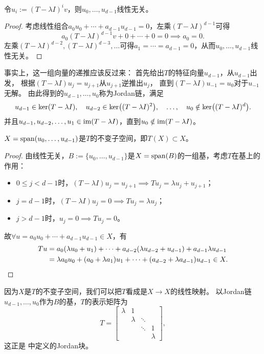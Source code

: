 \begin{theorem}{}{}
	令$u_i:=(T-\lambda I)^iv$，则$u_0,\ldots,u_{d-1}$线性无关。
\end{theorem}

\begin{proof}
	考虑线性组合$a_0u_0+\cdots+a_{d-1}u_{d-1}=0$，左乘$(T-\lambda I)^{d-1}$可得
	\[
		a_0(T-\lambda I)^{d-1}v+0+\cdots+0=0\implies a_0=0.
	\]
	左乘$(T-\lambda I)^{d-2},(T-\lambda I)^{d-3},\ldots$可得$a_1=\cdots=a_{d-1}=0$，从而$u_0,\ldots,u_{d-1}$线性无关。
\end{proof}

\begin{remark}
	事实上，这一组向量的递推应该反过来：
	首先给出$T$的特征向量$u_{d-1}$，从$u_{d-1}$出发，
	根据$(T-\lambda I)u_j=u_{j+1}$从$u_{j+1}$逆推出$u_j$，
	直到$(T-\lambda I)u_{-1}=u_0$对于$u_{-1}$无解。
	由此得到的$u_{d-1},\ldots,u_0$称为Jordan链，满足
	\[
		u_{d-1}\in\ker(T-\lambda I),\quad
		u_{d-2}\in\ker\bigl((T-\lambda I)^2\bigr),\quad
		\ldots,\quad
		u_0\notin\ker\bigl((T-\lambda I)^d\bigr).
	\]
	并且$u_{d-1},u_{d-2},\ldots,u_1\in\operatorname{im}(T-\lambda I)$，直到$u_0\notin\operatorname{im}(T-\lambda I)$。
\end{remark}

\begin{theorem}{}{}
	$X=\operatorname{span}(u_0,\ldots,u_{d-1})$是$T$的不变子空间，即$T(X)\subset X$。
\end{theorem}

\begin{proof}
	由线性无关，$B:=\{u_0,\ldots,u_{d-1}\}$是$X=\operatorname{span}(B)$的一组基，考虑$T$在基上的作用：
	\begin{itemize}
		\item $0\leq j< d-1$时，$(T-\lambda I)u_j=u_{j+1}\implies Tu_j=\lambda u_j+u_{j+1}$；
		\item $j=d-1$时，$(T-\lambda I)u_j=0\implies Tu_j=\lambda u_j$；
		\item $j>d-1$时，$u_j=0\implies Tu_j=0$。
	\end{itemize}
	故$\forall u=a_0u_0+\cdots+a_{d-1}u_{d-1}\in X$，有
	\begin{align*}
		Tu&=a_0(\lambda u_0+u_1)+\cdots+a_{d-2}(\lambda u_{d-2}+u_{d-1})+a_{d-1}\lambda u_{d-1}\\
		&=\lambda a_0u_0+(a_0+\lambda a_1)u_1+\cdots+(a_{d-2}+\lambda a_{d-1})u_{d-1}\in X.
		\qedhere
	\end{align*}
\end{proof}

\begin{corollary}
	因为$X$是$T$的不变子空间，我们可以把$T$看成是$X\to X$的线性映射。
	以Jordan链$u_{d-1},\ldots,u_0$作为$B$的基，$T$的表示矩阵为
	\[
		T=\begin{bmatrix}
			\lambda&1\\ &\lambda&\ddots\\ &&\ddots&1\\ &&&\lambda
		\end{bmatrix},
	\]
	这正是 中定义的Jordan块。
\end{corollary}

